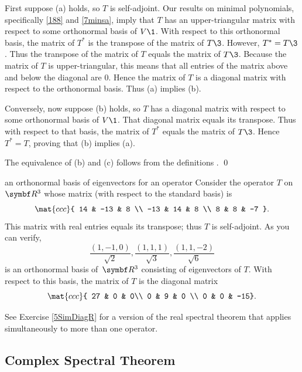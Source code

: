 \proof
First suppose (a) holds, so $T$ is self-adjoint. Our results on minimal polynomials, specifically \ref{188} and \ref{7minsa}, imply that $T$ has an upper-triangular matrix with respect to some orthonormal basis of $V\1$. With respect to this orthonormal basis, the matrix of $T^*$ is the transpose of the matrix of $T\3$. However, $T^* = T\3$. Thus the transpose of the matrix of $T$ equals the matrix of $T\3$. Because the matrix of $T$ is upper-triangular, this means that all entries of the matrix above and below the diagonal are $0$. Hence the matrix of $T$ is a diagonal matrix with respect to the orthonormal basis. Thus (a) implies (b).

Conversely, now suppose (b) holds, so $T$ has a diagonal matrix with respect to some orthonormal basis of $V\1$. That diagonal matrix equals its transpose. Thus with respect to that basis, the matrix of $T^*$ equals the matrix of $T\3$. Hence $T^* = T$, proving that (b) implies (a).

The equivalence of (b) and (c) follows from the definitions .
\qed

\begin{example}{an orthonormal basis of eigenvectors for an operator}
Consider the operator $T$ on~$\R{3}$ whose matrix (with respect to the standard basis) is
\vspace{-6bp}
\[
\mat{ccc}{
14 & -13 & 8 \\
-13 & 14 & 8 \\
8 & 8 & -7 }.
\]
This matrix with real entries equals its transpose; thus $T$ is self-adjoint. As you can verify,
\[
\frac{(1, -1, 0)}{\sqrt{2}},
\frac{(1, 1, 1)}{\sqrt{3}},
\frac{(1, 1, -2)}{\sqrt{6}}
\]
is an orthonormal basis of~$\R{3}$ consisting of eigenvectors of $T$.
With respect to this basis, the matrix of $T$ is the diagonal matrix
\[
\mat{ccc}{
27 & 0 & 0\\
0 & 9 & 0 \\
0 & 0 & -15}.
\]
\vspace{-.16in}
\end{example}

 See Exercise \ref{5SimDiagR} for a version of the real spectral theorem that applies simultaneously to more than one operator.

 \pagebreak[3]

\subsection{Complex Spectral Theorem}

